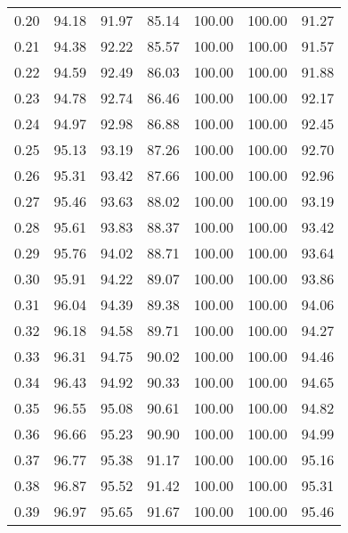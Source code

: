 \begin{tabular}{|c|c|c|c|c|c|c|}
      0.20 &     94.18 &     91.97 &      85.14 &  100.00 &     100.00 &         91.27 \\
      0.21 &     94.38 &     92.22 &      85.57 &  100.00 &     100.00 &         91.57 \\
      0.22 &     94.59 &     92.49 &      86.03 &  100.00 &     100.00 &         91.88 \\
      0.23 &     94.78 &     92.74 &      86.46 &  100.00 &     100.00 &         92.17 \\
      0.24 &     94.97 &     92.98 &      86.88 &  100.00 &     100.00 &         92.45 \\
      0.25 &     95.13 &     93.19 &      87.26 &  100.00 &     100.00 &         92.70 \\
      0.26 &     95.31 &     93.42 &      87.66 &  100.00 &     100.00 &         92.96 \\
      0.27 &     95.46 &     93.63 &      88.02 &  100.00 &     100.00 &         93.19 \\
      0.28 &     95.61 &     93.83 &      88.37 &  100.00 &     100.00 &         93.42 \\
      0.29 &     95.76 &     94.02 &      88.71 &  100.00 &     100.00 &         93.64 \\
      0.30 &     95.91 &     94.22 &      89.07 &  100.00 &     100.00 &         93.86 \\
      0.31 &     96.04 &     94.39 &      89.38 &  100.00 &     100.00 &         94.06 \\
      0.32 &     96.18 &     94.58 &      89.71 &  100.00 &     100.00 &         94.27 \\
      0.33 &     96.31 &     94.75 &      90.02 &  100.00 &     100.00 &         94.46 \\
      0.34 &     96.43 &     94.92 &      90.33 &  100.00 &     100.00 &         94.65 \\
      0.35 &     96.55 &     95.08 &      90.61 &  100.00 &     100.00 &         94.82 \\
      0.36 &     96.66 &     95.23 &      90.90 &  100.00 &     100.00 &         94.99 \\
      0.37 &     96.77 &     95.38 &      91.17 &  100.00 &     100.00 &         95.16 \\
      0.38 &     96.87 &     95.52 &      91.42 &  100.00 &     100.00 &         95.31 \\
      0.39 &     96.97 &     95.65 &      91.67 &  100.00 &     100.00 &         95.46 \\

\end{tabular}
